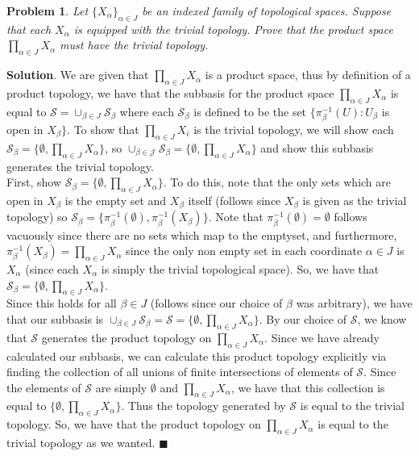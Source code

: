 \documentclass[12pt]{article}
\renewcommand{\=}[1]{\stackrel{#1}{=}} %
\newtheorem{p}{Problem}[section]
\theoremstyle{definition}
\newenvironment{s}{%
        \begin{trivlist} \item \textbf{Solution}. }{%
            \hspace*{\fill} $\blacksquare$\end{trivlist}}%
\begin{document}
\begin{p}
    Let $\{X_{\alpha}\}_{\alpha\in J}$ be an indexed family of topological spaces. Suppose that each $X_{\alpha}$ is equipped with the trivial
    topology. Prove that the product space $\prod_{\alpha\in J}X_{\alpha}$ must have the trivial topology.
\end{p}
\begin{s}
    We are given that $\prod_{\alpha\in J} X_{\alpha}$ is a product space, thus by definition of a product topology, we have that the subbasis for
    the product space $\prod_{\alpha\in J} X_{\alpha}$ is equal to $\mathcal{S} = \cup_{\beta\in J} \mathcal{S}_{\beta}$ where each $\mathcal{S}_{\beta}$
    is defined to be the set $\{\pi_{\beta}^{-1}(U): U_{\beta}$ is open in $X_{\beta}\}$. To show that $\prod_{\alpha\in J} X_i$ is the trivial topology,
    we will show each $\mathcal{S}_{\beta} = \{\emptyset, \prod_{\alpha\in J} X_{\alpha}\}$, so $\cup_{\mathcal{\beta\in J}} \mathcal{S}_{\beta} = 
    \{\emptyset, \prod_{\alpha\in J} X_{\alpha}\}$ and show this subbasis generates the trivial topology.\\
    First, show $\mathcal{S}_{\beta} = \{\emptyset, \prod_{\alpha\in J} X_{\alpha}\}$. To do this, note that the only sets which are open in $X_{\beta}$
    is the empty set and $X_{\beta}$ itself (follows since $X_{\beta}$ is given as the trivial topology) so $\mathcal{S}_{\beta} = \{\pi_{\beta}^{-1}(\emptyset),
    \pi_{\beta}^{-1}(X_{\beta})\}$. Note that $\pi_{\beta}^{-1}(\emptyset) = \emptyset$ follows vacuously since there are no sets which map to the emptyset, and
    furthermore, $\pi_{\beta}^{-1}(X_{\beta}) = \prod_{\alpha\in J}X_{\alpha}$ since the only non empty set in each coordinate $\alpha\in J$ is $X_{\alpha}$ (since
    each $X_{\alpha}$ is simply the trivial topological space). So, we have that $\mathcal{S}_{\beta} = \{\emptyset, \prod_{\alpha\in J} X_{\alpha}\}$.\\
    Since this holds for all $\beta\in J$ (follows since our choice of $\beta$ was arbitrary), we have that our subbasis is 
    $\cup_{\beta\in J} \mathcal{S}_{\beta} = \mathcal{S} = \{\emptyset,\prod_{\alpha\in J} X_{\alpha}\}$. By our choice of $\mathcal{S}$, we know that
    $\mathcal{S}$ generates the product topology on $\prod_{\alpha\in J} X_{\alpha}$. Since we have already calculated our subbasis, we can calculate this
    product topology explicitly via finding the collection of all unions of finite intersections of elements of $\mathcal{S}$. Since the elements of
    $\mathcal{S}$ are simply $\emptyset$ and $\prod_{\alpha\in J} X_{\alpha}$, we have that this collection is equal to $\{\emptyset, \prod_{\alpha\in J} X_{\alpha}\}$.
    Thus the topology generated by $\mathcal{S}$ is equal to the trivial topology. So, we have that the product topology on $\prod_{\alpha\in J} X_{\alpha}$ is equal
    to the trivial topology as we wanted.
\end{s}
\end{document}

